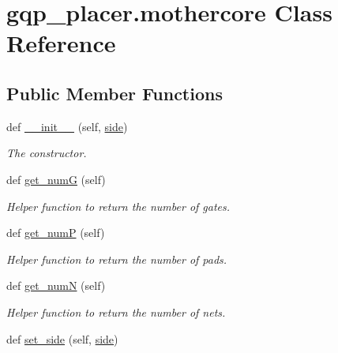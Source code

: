 \hypertarget{classgqp__placer_1_1mothercore}{}\section{gqp\+\_\+placer.\+mothercore Class Reference}
\label{classgqp__placer_1_1mothercore}
\subsection*{Public Member Functions}
\begin{DoxyCompactItemize}
\item 
def \hyperlink{classgqp__placer_1_1mothercore_a0fdfdd800f6104a0b6a68599559c750f}{\+\_\+\+\_\+init\+\_\+\+\_\+} (self, \hyperlink{classgqp__placer_1_1mothercore_adda3ce69f8cb37fd8de8fc66e700500a}{side})
\begin{DoxyCompactList}\small\item\em The constructor. \end{DoxyCompactList}\item 
def \hyperlink{classgqp__placer_1_1mothercore_adcbc5a7363bec0ed2557df3b9560c16c}{get\+\_\+numG} (self)
\begin{DoxyCompactList}\small\item\em Helper function to return the number of gates. \end{DoxyCompactList}\item 
def \hyperlink{classgqp__placer_1_1mothercore_ae4aa5a084403ae3fcbedad7fc40b2b0f}{get\+\_\+numP} (self)\hypertarget{classgqp__placer_1_1mothercore_ae4aa5a084403ae3fcbedad7fc40b2b0f}{}\label{classgqp__placer_1_1mothercore_ae4aa5a084403ae3fcbedad7fc40b2b0f}

\begin{DoxyCompactList}\small\item\em Helper function to return the number of pads. \end{DoxyCompactList}\item 
def \hyperlink{classgqp__placer_1_1mothercore_aedecd9639f2d26eb74ebaf94bccd7752}{get\+\_\+numN} (self)\hypertarget{classgqp__placer_1_1mothercore_aedecd9639f2d26eb74ebaf94bccd7752}{}\label{classgqp__placer_1_1mothercore_aedecd9639f2d26eb74ebaf94bccd7752}

\begin{DoxyCompactList}\small\item\em Helper function to return the number of nets. \end{DoxyCompactList}\item 
def \hyperlink{classgqp__placer_1_1mothercore_a2b73ac270372e97d8e990effedd75d17}{set\+\_\+side} (self, \hyperlink{classgqp__placer_1_1mothercore_adda3ce69f8cb37fd8de8fc66e700500a}{side})\hypertarget{classgqp__placer_1_1mothercore_a2b73ac270372e97d8e990effedd75d17}{}\label{classgqp__placer_1_1mothercore_a2b73ac270372e97d8e990effedd75d17}


\end{DoxyCompactItemize}
